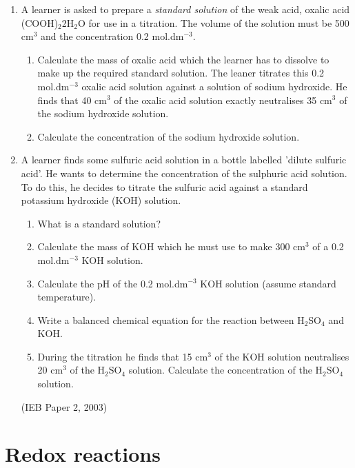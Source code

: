 {\begin{enumerate}
\item{A learner is asked to prepare a \textit{standard solution} of the weak acid, oxalic acid (COOH)$_{2}$2H$_{2}$O for use in a titration. The volume of the solution must be 500 cm$^{3}$ and the concentration 0.2 mol.dm$^{-3}$. 
	\begin{enumerate}
	\item{Calculate the mass of oxalic acid which the learner has to dissolve to make up the required standard solution.}
The leaner titrates this 0.2 mol.dm$^{-3}$ oxalic acid solution against a solution of sodium hydroxide. He finds that 40 cm$^{3}$ of the oxalic acid solution exactly neutralises 35 cm$^{3}$ of the sodium hydroxide solution.
	\item{Calculate the concentration of the sodium hydroxide solution.}
	\end{enumerate}
}

\item{A learner finds some sulfuric acid solution in a bottle labelled 'dilute sulfuric acid'. He wants to determine the concentration of the sulphuric acid solution. To do this, he decides to titrate the sulfuric acid against a standard potassium hydroxide (KOH) solution.

	\begin{enumerate}
	\item{What is a standard solution?}
	\item{Calculate the mass of KOH which he must use to make 300 cm$^{3}$ of a 0.2 mol.dm$^{-3}$ KOH solution.}
	\item{Calculate the pH of the 0.2 mol.dm$^{-3}$ KOH solution (assume standard temperature).}
	\item{Write a balanced chemical equation for the reaction between H$_{2}$SO$_{4}$ and KOH.}
	\item{During the titration he finds that 15 cm$^{3}$ of the KOH solution neutralises 20 cm$^{3}$ of the H$_{2}$SO$_{4}$ solution. Calculate the concentration of the H$_{2}$SO$_{4}$ solution.}
	\end{enumerate}
(IEB Paper 2, 2003)
}

\end{enumerate}
}








\section{Redox reactions}
\label{sec:reactiontypes:redox}

